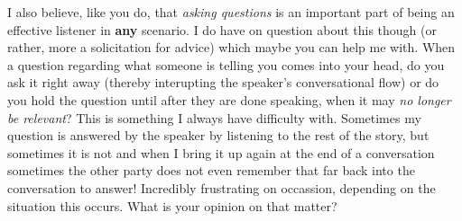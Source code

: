       I also believe, like you do, that \textit{asking questions} is an
        important part of being an effective listener in \textbf{any} scenario.
        I do have on question about this though (or rather, more a solicitation
        for advice) which maybe you can help me with. When a question regarding
        what someone is telling you comes into your head, do you ask it right
        away (thereby interupting the speaker's conversational flow) or do you
        hold the question until after they are done speaking, when it may
        \textit{no longer be relevant}? This is something I always have
        difficulty with. Sometimes my question is answered by the speaker by
        listening to the rest of the story, but sometimes it is not and when
        I bring it up again at the end of a conversation sometimes the other
        party does not even remember that far back into the conversation to
        answer! Incredibly frustrating on occassion, depending on the situation
        this occurs. What is your opinion on that matter?
